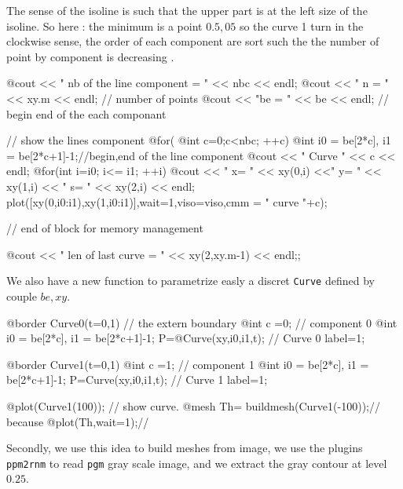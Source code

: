 \documentclass[a4paper,twoside,12pt]{book}
\begin{document}
\begin{example}
{The  sense  of the  isoline is such that the upper part is at the left  size of the  isoline.
So here : the minimum is a point $0.5,05$ so  the curve 1 turn in the clockwise  sense, 
the order of each component are sort such the the number of point by component is decreasing .

\bFF   
  @cout << " nb of the line  component   = " << nbc << endl; 
  @cout << " n = " << xy.m << endl; // number  of points 
  @cout << "be = " << be << endl; //  begin end of the each componant

  // show the lines component 
  @for( @int c=0;c<nbc; ++c) 
  {
    @int i0 = be[2*c], i1 = be[2*c+1]-1;//begin,end of the line component
    @cout << " Curve " << c << endl; 
    @for(int i=i0; i<= i1; ++i)
       @cout << " x= " << xy(0,i) <<" y= " << xy(1,i) << " s= " 
             << xy(2,i) << endl; 
    plot([xy(0,i0:i1),xy(1,i0:i1)],wait=1,viso=viso,cmm = " curve "+c);
  }
}// end of block for  memory management 

@cout << " len of  last  curve = " << xy(2,xy.m-1) << endl;; 
\eFF

We also have a  new function to parametrize easly  a
discret \texttt{Curve} defined by couple $be, xy$. 

\bFF
@border Curve0(t=0,1) // the extern boundary 
{ @int c =0; // component 0
  @int i0 = be[2*c], i1 = be[2*c+1]-1;   
  P=@Curve(xy,i0,i1,t); // Curve 0
  label=1; 
} 

@border Curve1(t=0,1) 
{ @int c =1; // component 1
  @int i0 = be[2*c], i1 = be[2*c+1]-1;   
  P=Curve(xy,i0,i1,t);  // Curve 1
  label=1; 
} 

@plot(Curve1(100)); // show curve. 
@mesh Th= buildmesh(Curve1(-100));// because 
@plot(Th,wait=1);// 
\eFF
\end{example}

Secondly, we use this idea to build meshes from image, we use the plugins
\texttt{ppm2rnm} to read \texttt{pgm} gray scale image, and we extract the 
gray contour at level $0.25$.  
\end{document}
